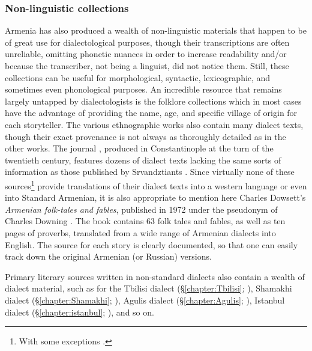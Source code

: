 \documentclass[output=paper]{langscibook}
\begin{document}
\subsubsection{Non-linguistic collections}\label{sec:vaux:documentation:arm:nonling}

 
Armenia has also produced a wealth of non-linguistic materials that happen to be of great use for dialectological purposes, though their transcriptions are often unreliable, omitting phonetic nuances in order to increase readability and/or because the transcriber, not being a linguist, did not notice them. Still, these collections can be useful for morphological, syntactic, lexicographic, and sometimes even phonological purposes. An incredible resource that remains largely untapped by dialectologists is the folklore collections   \citep{TerAgheksandrian-1885-Tiflis,Lalayan-1892-Javakhk,Lalayan-1899-Zangezur,Lalayian-1900-Ganzdak,Shatakhi-1913-VaspurakanFolkoreShatakih,GrigoryanSpandaryan-1971-KarabakhFolklore,Abeghyan-1944-SasunDevil,Malkhasyants-1958-Akhaltskha,OrbeliNazinyan-1959-PopularTales,Arakelyan-1970-Ethnography}  which in most cases have the advantage of providing the name, age, and specific village of origin for each storyteller. The various ethnographic works \citep{manana,Srvantsiants-1884-HamovHodov,Srvantsiants-1879-1884-BrotherToros}  also contain many dialect texts, though their exact provenance is not always as thoroughly detailed as in the other works. The journal   , produced in Constantinople at the turn of the twentieth century, features dozens of dialect texts lacking the same sorts of information as those published by Srvandztiants \citep{manana}. Since virtually none of these sources\footnote{With some exceptions \citep{Svazlyan-1994-Cilicia}.}   provide translations of their dialect texts into a western language or even into Standard Armenian, it is also appropriate to mention here Charles Dowsett's \textit{Armenian folk-tales and fables}, published in 1972 under the pseudonym of Charles Downing \citep{Downing-1972-Armenianfolktalesfables}. The book contains 63 folk tales and fables, as well as ten pages of proverbs, translated from a wide range of Armenian dialects into English. The source for each story is clearly documented, so that one can easily track down the original Armenian (or Russian) versions.

Primary literary sources written in non-standard dialects also contain a wealth of dialect material, such as for the Tbilisi dialect (\S\ref{chapter:Tbilisi}; \citealt{SayatNova,Sundukyan-1951-CompleteCollection}),   Shamakhi dialect (\S\ref{chapter:Shamakhi}; \citealt{Shirvanzade-1958-Erker}),  Agulis dialect (\S\ref{chapter:Agulis}; \citealt{Zargariants-1912-AdatChi}), Istanbul dialect (\S\ref{chapter:istanbul}; \citealt{Ayvaz-2003-LutsikaDudu}), and so on. 
\end{document}
